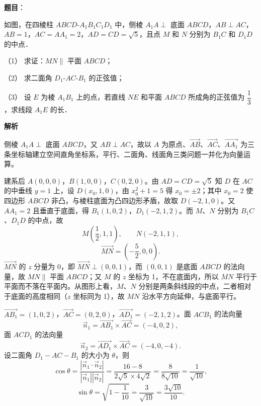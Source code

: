 \begin{answer}

\textbf{题目}：

如图，在四棱柱 \(ABCD\text{-}A_1B_1C_1D_1\) 中，侧棱 \(A_1A\perp\) 底面 \(ABCD\)，\(AB\perp AC\)，\(AB=1\)，\(AC=AA_1=2\)，\(AD=CD=\sqrt{5}\)，且点 \(M\) 和 \(N\) 分别为 \(B_1C\) 和 \(D_1D\) 的中点．
\nopagebreak[4]
\begin{center}\end{center}
\nopagebreak[4]
（1） 求证：\(MN\parallel\) 平面 \(ABCD\)；

（2） 求二面角 \(D_1\text{-}AC\text{-}B_1\) 的正弦值；

（3） 设 \(E\) 为棱 \(A_1B_1\) 上的点，若直线 \(NE\) 和平面 \(ABCD\) 所成角的正弦值为 \(\dfrac{1}{3}\)，求线段 \(A_1E\) 的长．

\textbf{解析}

侧棱 \(A_{1}A\perp\) 底面 \(ABCD\)，又 \(AB\perp AC\)，故以 \(A\) 为原点、\(\overrightarrow{AB}\)、\(\overrightarrow{AC}\)、\(\overrightarrow{AA_{1}}\) 为三条坐标轴建立空间直角坐标系，平行、二面角、线面角三类问题一并化为向量运算。


建系后 \(A(0,0,0)\)，\(B(1,0,0)\)，\(C(0,2,0)\)。由 \(AD=CD=\sqrt{5}\) 知 \(D\) 在 \(AC\) 的中垂线 \(y=1\) 上，设 \(D(x_{0},1,0)\)，由 \(x_{0}^{2}+1=5\) 得 \(x_{0}=\pm2\)；其中 \(x_{0}=2\) 使四边形 \(ABCD\) 非凸，与棱柱底面为凸四边形矛盾，故取 \(D(-2,1,0)\)。又 \(AA_{1}=2\) 且垂直于底面，得 \(B_{1}(1,0,2)\)，\(D_{1}(-2,1,2)\)。而 \(M\)、\(N\) 分别为 \(B_{1}C\)、\(D_{1}D\) 的中点，故
\nopagebreak[4]
\[
M\left(\dfrac{1}{2},1,1\right),\qquad N(-2,1,1),
\]
\nopagebreak[4]
\[
\overrightarrow{MN}=\left(-\dfrac{5}{2},0,0\right).
\]
\(\overrightarrow{MN}\) 的 \(z\) 分量为 0，即 \(\overrightarrow{MN}\perp(0,0,1)\)，而 \((0,0,1)\) 是底面 \(ABCD\) 的法向量，故 \(MN\parallel\) 平面 \(ABCD\)；又 \(M\) 的 \(z\) 坐标为 1，不在底面内，所以 \(MN\) 平行于平面而不落在平面内。从图形上看，\(M\)、\(N\) 分别是两条斜线段的中点，二者相对于底面的高度相同（\(z\) 坐标同为 1），故 \(MN\) 沿水平方向延伸，与底面平行。


\(\overrightarrow{AB_{1}}=(1,0,2)\)，\(\overrightarrow{AC}=(0,2,0)\)，\(\overrightarrow{AD_{1}}=(-2,1,2)\)。面 \(ACB_{1}\) 的法向量
\nopagebreak[4]
\[
\vec{n}_{1}=\overrightarrow{AB_{1}}\times\overrightarrow{AC}=(-4,0,2),
\]
面 \(ACD_{1}\) 的法向量
\nopagebreak[4]
\[
\vec{n}_{2}=\overrightarrow{AD_{1}}\times\overrightarrow{AC}=(-4,0,-4).
\]
设二面角 \(D_{1}-AC-B_{1}\) 的大小为 \(\theta\)，则
\nopagebreak[4]
\[
\cos\theta=\dfrac{\left|\vec{n}_{1}\cdot\vec{n}_{2}\right|}{\left|\vec{n}_{1}\right|\left|\vec{n}_{2}\right|}
=\dfrac{16-8}{2\sqrt{5}\times4\sqrt{2}}=\dfrac{8}{8\sqrt{10}}=\dfrac{1}{\sqrt{10}},
\]
\nopagebreak[4]
\[
\sin\theta=\sqrt{1-\dfrac{1}{10}}=\dfrac{3}{\sqrt{10}}=\dfrac{3\sqrt{10}}{10}.
\]


\end{answer}
